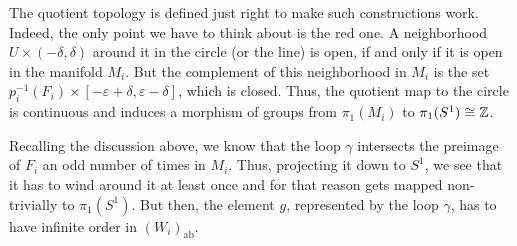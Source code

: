 The quotient topology is defined just right to make such constructions work.
Indeed, the only point we have to think about is the red one. %
A neighborhood \(U \times (-\delta, \delta)\) around it in the circle (or the line) is open, if and only if it is open in the manifold \(M_i\).
But the complement of this neighborhood in \(M_i\) is the set \(p_i^{-1}(F_i) \times [-\varepsilon + \delta, \varepsilon - \delta]\), which is closed.
Thus, the quotient map to the circle is continuous and induces a morphism of groups from \(\pi_1(M_i)\) to \(\pi_1(S^1) \cong \mathbb{Z}\).

Recalling the discussion above, we know that the loop \(\gamma\) intersects the preimage of \(F_i\) an odd number of times in \(M_i\).
Thus, projecting it down to \(S^1\), we see that it has to wind around it at least once and for that reason gets mapped non-trivially to \(\pi_1(S^1)\).
But then, the element \(g\), represented by the loop \(\gamma\), has to have infinite order in \((W_i)_\text{ab}\).
